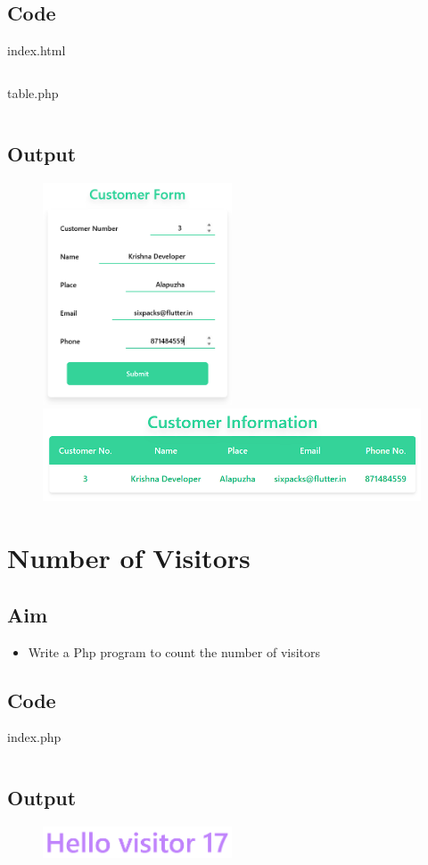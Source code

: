 \documentclass{article}
\begin{document}
\subsection{Code}
index.html
\inputminted[frame=lines, breaklines, breakanywhere, numberblanklines=false]{html}{./prog_21/index.html}
table.php
\inputminted[frame=lines, breaklines, breakanywhere, numberblanklines=false]{php}{./prog_21/table.php}

\subsection{Output}
\begin{figure}[h!]
	\centering
	\includegraphics[width=0.5\textwidth]{./Assets/p2101.png}
	\includegraphics[width=1\textwidth]{./Assets/p2102.png}
\end{figure}
\newpage

\section{Number of Visitors}
\subsection{Aim}
\begin{itemize}
  \item Write a Php program to count the number of visitors
\end{itemize}

\subsection{Code}
index.php
\inputminted[frame=lines, breaklines, breakanywhere, numberblanklines=false]{php}{./prog_22/index.php}

\subsection{Output}
\begin{figure}[h!]
	\centering
	\includegraphics[width=0.5\textwidth]{./Assets/p22.png}
\end{figure}
\newpage
\end{document}
